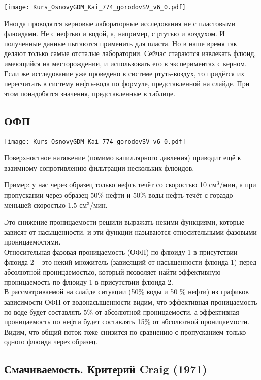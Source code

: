 \documentclass[main.tex]{subfiles}
\begin{document}
\texttt{[image: Kurs\_OsnovyGDM\_Kai\_774\_gorodovSV\_v6\_0.pdf]}

Иногда проводятся керновые лабораторные исследования не с пластовыми флюидами.
Не с нефтью и водой, а, например, с ртутью и воздухом.
И полученные данные пытаются применить для пласта.
Но в наше время так делают только самые отсталые лаборатории.
Сейчас стараются извлекать флюид, имеющийся на месторождении, и использовать его в экспериментах с керном.
Если же исследование уже проведено в системе ртуть-воздух, то придётся их пересчитать в систему нефть-вода по формуле, представленной на слайде.
При этом понадобятся значения, представленные в таблице.

\subsection{ОФП}

\texttt{[image: Kurs\_OsnovyGDM\_Kai\_774\_gorodovSV\_v6\_0.pdf]}

Поверхностное натяжение (помимо капиллярного давления) приводит ещё к взаимному сопротивлению фильтрации нескольких флюидов.

Пример: у нас через образец только нефть течёт со скоростью 10 см$^3$/мин, а при пропускании через образец 50\% нефти и 50\% воды нефть течёт с гораздо меньшей скоростью 1.5 см$^3$/мин.

Это снижение проницаемости решили выражать некими функциями, которые зависят от насыщенности, и эти функции называются относительными фазовыми проницаемостями.
\\

Относительная фазовая проницаемость (ОФП) по флюиду 1 в присутствии флюида 2 -- это некий множитель (зависящий от насыщенности флюида 1) перед абсолютной проницаемостью, который позволяет найти эффективную проницаемость по флюиду 1 в присутствии флюида 2.
\\

В рассматриваемой на слайде ситуации (50\% воды и 50 \% нефти) из графиков зависимости ОФП от водонасыщенности видим, что эффективная проницаемость по воде будет составлять 5\% от абсолютной проницаемости, а эффективная проницаемость по нефти будет составлять 15\% от абсолютной проницаемости.
Видим, что общий поток тоже снизится по сравнению с пропусканием только одного флюида через образец.

\subsection{Смачиваемость. Критерий Craig (1971)}
\end{document}

